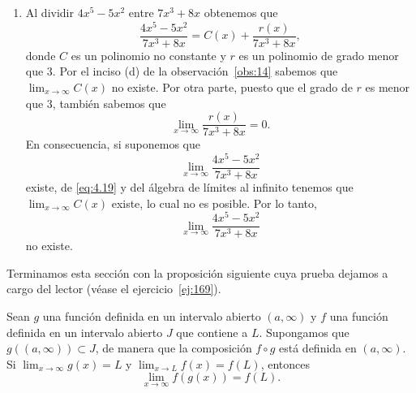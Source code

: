 \documentclass[12pt,a4paper]{book}
\begin{document}
\begin{ejemplo}
\begin{enumerate}
\begin{align*}
                &=\frac{4-0}{7+0}\\
                &=\frac{4}{7}.
            \end{align*}
            \item Al dividir $4x^{5}-5x^{2}$ entre $7x^{3}+8x$ obtenemos que
            \begin{equation}\label{eq:4.19}
                \frac{4x^{5}-5x^{2}}{7x^{3}+8x}=C(x)+\frac{r(x)}{7x^{3}+8x},
            \end{equation}
            donde $C$ es un polinomio no constante y $r$ es un polinomio de grado menor
            que $3$. Por el inciso (d) de la observación~\ref{obs:14} sabemos que $\lim_{x\to\infty}C(x)$ no
            existe. Por otra parte, puesto que el grado de $r$ es menor que $3$, también
            sabemos que
            \begin{equation*}
                \lim_{x\to\infty}\frac{r(x)}{7x^{3}+8x}=0.
            \end{equation*}
            En consecuencia, si suponemos que
            \begin{equation*}
                \lim_{x\to\infty}\frac{4x^{5}-5x^{2}}{7x^{3}+8x}
            \end{equation*}
            existe, de \eqref{eq:4.19} y del álgebra de límites al infinito tenemos que $\lim_{x\to\infty}C(x)$
            existe, lo cual no es posible. Por lo tanto,
            \begin{equation*}
                \lim_{x\to\infty}\frac{4x^{5}-5x^{2}}{7x^{3}+8x}
            \end{equation*}
            no existe.\finej
        \end{enumerate}
    \end{ejemplo}

    Terminamos esta sección con la proposición siguiente cuya prueba dejamos
    a cargo del lector (véase el ejercicio~\ref{ej:169}).

    \begin{proposicion}\label{prop:46}
        Sean
        $g$ una función definida en un intervalo abierto $(a,\infty)$ y $f$ una función definida
        en un intervalo abierto $J$ que contiene a $L$. Supongamos que $g((a,\infty))\subset J$,
        de manera que la composición $f\circ g$ está definida en $(a,\infty)$. Si $\lim_{x\to\infty}g(x)=
        L$ y $\lim_{x\to L}f(x)=f(L)$, entonces
        \begin{equation*}
            \lim_{x\to\infty}f(g(x))=f(L).
        \end{equation*}
    \end{proposicion}
\end{document}
